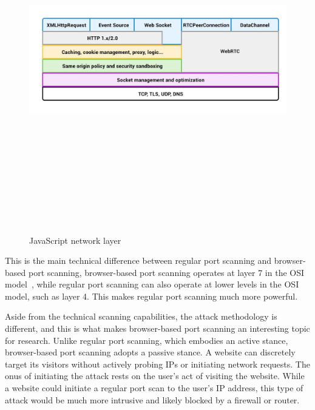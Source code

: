 \begin{figure}[h]
    \centering
    \includegraphics[width=15cm, height=15cm, keepaspectratio]{background/img/js_network_stack.jpg}
    \caption{JavaScript network layer~\cite{medium_js_networking}}
    \label{fig:js-network-stack}
\end{figure}

This is the main technical difference between regular port scanning and browser-based port scanning, browser-based port scanning operates at layer 7 in the OSI model~\cite{kumar2014}, while regular port scanning can also operate at lower levels in the OSI model, such as layer 4. This makes regular port scanning much more powerful.

Aside from the technical scanning capabilities, the attack methodology is different, and this is what makes browser-based port scanning an interesting topic for research. 
Unlike regular port scanning, which embodies an active stance, browser-based port scanning adopts a passive stance. A website can discretely target its visitors without actively probing IPs or initiating network requests. The onus of initiating the attack rests on the user's act of visiting the website. 
While a website could initiate a regular port scan to the user's IP address, this type of attack would be much more intrusive and likely blocked by a firewall or router.

